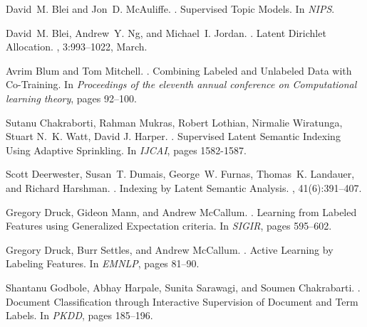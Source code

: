 \documentclass[11pt]{article}
\begin{document}
\begin{thebibliography}{10}

David~M. Blei and Jon~D. McAuliffe.
.
\newblock Supervised Topic Models.
\newblock In {\em NIPS}.

David~M. Blei, Andrew~Y. Ng, and Michael~I. Jordan.
.
\newblock Latent Dirichlet Allocation.
, 3:993--1022, March.

Avrim Blum and Tom Mitchell.
.
\newblock Combining Labeled and Unlabeled Data with Co-Training.
\newblock In {\em Proceedings of the eleventh annual conference on
  Computational learning theory}, pages 92--100.

Sutanu Chakraborti, Rahman Mukras, Robert Lothian, Nirmalie Wiratunga, Stuart N.~K. Watt, David J. Harper.
.
\newblock Supervised Latent Semantic Indexing Using Adaptive Sprinkling.
\newblock In {\em IJCAI}, pages 1582-1587.

Scott Deerwester, Susan~T. Dumais, George~W. Furnas, Thomas~K. Landauer, and
  Richard Harshman.
.
\newblock Indexing by Latent Semantic Analysis.
, 41(6):391--407.

Gregory Druck, Gideon Mann, and Andrew McCallum.
.
\newblock Learning from Labeled Features using Generalized Expectation
  criteria.
\newblock In {\em SIGIR}, pages 595--602.

Gregory Druck, Burr Settles, and Andrew McCallum.
.
\newblock Active Learning by Labeling Features.
\newblock In {\em EMNLP}, pages 81--90.

Shantanu Godbole, Abhay Harpale, Sunita Sarawagi, and Soumen Chakrabarti.
.
\newblock Document Classification through Interactive Supervision of Document
  and Term Labels.
\newblock In {\em PKDD}, pages 185--196.


\end{thebibliography}
\end{document}
